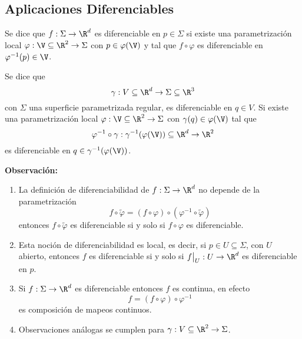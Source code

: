 \documentclass{article}
\begin{document}
\subsection{Aplicaciones Diferenciables}
\begin{dfn}
    Se dice que $f:\Sigma\to\R^{d}$ es diferenciable en $p\in\Sigma$ si existe una parametrización
    local $\varphi:\V\subseteq\R^{2}\to\Sigma$ con $p\in\varphi(\V)$ y tal que $f\circ\varphi$ es 
    diferenciable en $\varphi^{-1}(p)\in\V$.
\end{dfn}

\begin{dfn}
    Se dice que
    \begin{equation*}
        \gamma:V\subseteq\R^{d}\to\Sigma\subseteq\R^{3}
    \end{equation*}
    con $\Sigma$ una superficie parametrizada regular, es diferenciable en $q\in V$. Si existe una
    parametrización local $\varphi:\V\subseteq\R^{2}\to\Sigma$ con $\gamma(q)\in\varphi(\V)$ tal 
    que
    \begin{equation*}
        \varphi^{-1}\circ\gamma:\gamma^{-1}(\varphi(\V))\subseteq\R^{d}\to\R^{2}
    \end{equation*}
    es diferenciable en $q\in\gamma^{-1}(\varphi(\V))$.
\end{dfn}

\noindent\textbf{Observación:}
\begin{enumerate}
    \item La definición de diferenciabilidad de $f:\Sigma\to\R^{d}$ no depende de la 
    parametrización
    \begin{equation*}
        f\circ\widetilde{\varphi}=(f\circ\varphi)\circ(\varphi^{-1}\circ\widetilde{\varphi})
    \end{equation*}
    entonces $f\circ\widetilde{\varphi}$ es diferenciable si y solo si $f\circ\varphi$ es 
    diferenciable.

    \item Esta noción de diferenciabilidad es local, es decir, si $p\in U\subseteq\Sigma$, con
    $U$ abierto, entonces $f$ es diferenciable si y solo si $f\big|_{U}:U\to\R^{d}$ es 
    diferenciable en $p$.
    
    \item Si $f:\Sigma\to\R^{d}$ es diferenciable entonces $f$ es continua, en efecto
    \begin{equation*}
        f=(f\circ\varphi)\circ\varphi^{-1}
    \end{equation*}
    es composición de mapeos continuos.

    \item Observaciones análogas se cumplen para $\gamma:V\subseteq\R^{2}\to\Sigma$.
\end{enumerate}
\end{document}
